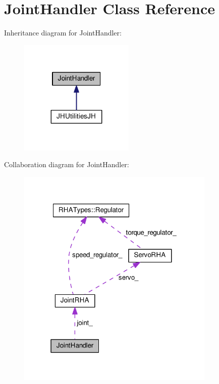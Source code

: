\hypertarget{classJointHandler}{}\section{Joint\+Handler Class Reference}
\label{classJointHandler}


Inheritance diagram for Joint\+Handler\+:
\nopagebreak
\begin{figure}[H]
\begin{center}
\leavevmode
\includegraphics[width=155pt]{classJointHandler__inherit__graph}
\end{center}
\end{figure}


Collaboration diagram for Joint\+Handler\+:
\nopagebreak
\begin{figure}[H]
\begin{center}
\leavevmode
\includegraphics[width=268pt]{classJointHandler__coll__graph}
\end{center}
\end{figure}
